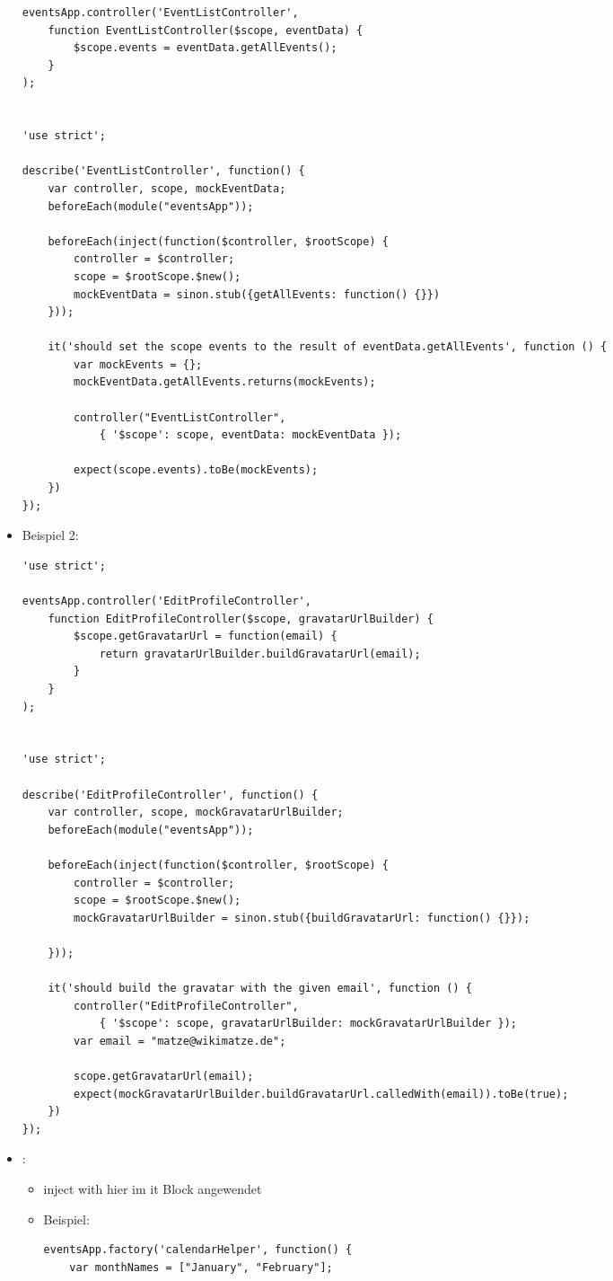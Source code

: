 \begin{itemize}
\begin{verbatim}
eventsApp.controller('EventListController',
    function EventListController($scope, eventData) {
        $scope.events = eventData.getAllEvents();
    }
);


'use strict';

describe('EventListController', function() {
    var controller, scope, mockEventData;
    beforeEach(module("eventsApp"));

    beforeEach(inject(function($controller, $rootScope) {
        controller = $controller;
        scope = $rootScope.$new();
        mockEventData = sinon.stub({getAllEvents: function() {}})
    }));

    it('should set the scope events to the result of eventData.getAllEvents', function () {
        var mockEvents = {};
        mockEventData.getAllEvents.returns(mockEvents);

        controller("EventListController",
            { '$scope': scope, eventData: mockEventData });

        expect(scope.events).toBe(mockEvents);
    })
});
    \end{verbatim}
  \item Beispiel 2:
    \begin{verbatim}
'use strict';

eventsApp.controller('EditProfileController',
    function EditProfileController($scope, gravatarUrlBuilder) {
        $scope.getGravatarUrl = function(email) {
            return gravatarUrlBuilder.buildGravatarUrl(email);
        }
    }
);


'use strict';

describe('EditProfileController', function() {
    var controller, scope, mockGravatarUrlBuilder;
    beforeEach(module("eventsApp"));

    beforeEach(inject(function($controller, $rootScope) {
        controller = $controller;
        scope = $rootScope.$new();
        mockGravatarUrlBuilder = sinon.stub({buildGravatarUrl: function() {}});

    }));

    it('should build the gravatar with the given email', function () {
        controller("EditProfileController",
            { '$scope': scope, gravatarUrlBuilder: mockGravatarUrlBuilder });
        var email = "matze@wikimatze.de";

        scope.getGravatarUrl(email);
        expect(mockGravatarUrlBuilder.buildGravatarUrl.calledWith(email)).toBe(true);
    })
});
    \end{verbatim}
  \item {}:
    \begin{itemize}
      \item inject with hier im it Block angewendet
      \item Beispiel:
        \begin{verbatim}
eventsApp.factory('calendarHelper', function() {
    var monthNames = ["January", "February"];


\end{verbatim}
\end{itemize}
\end{itemize}
